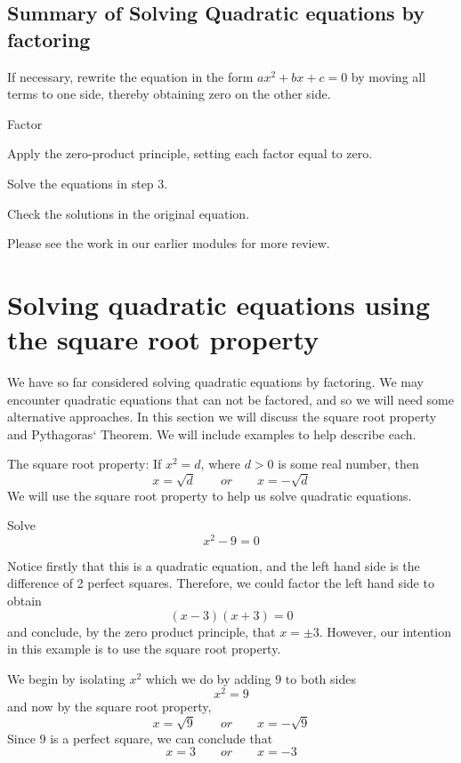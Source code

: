 \subsection{Summary of Solving Quadratic equations by factoring}
\begin{steps}
	\item If necessary, rewrite the equation in the form $ax^2+bx+c=0$ by moving all terms to one side, thereby obtaining
	zero on the other side.
	\item  Factor
	\item Apply the zero-product principle, setting each factor equal to zero.
	\item Solve the equations in step 3.
	\item Check the solutions in the original equation. 
\end{steps} 
Please see the work in our earlier modules for more review.

\section{Solving quadratic equations using the square root property}
%
We have so far considered solving quadratic equations by factoring. We may encounter quadratic equations
that can not be factored, and so we will need some alternative approaches. In this section we will discuss the square root property
and Pythagoras` Theorem. We will include examples to help describe each.
\begin{myDefinition}
	The square root property: If $x^2=d$, where $d>0$ is some real number, then
	\[
		x=\sqrt{d} \qquad or \qquad x=-\sqrt{d}
	\]
	{}
	We will use the square root property to help us solve quadratic equations.
\end{myDefinition}

\begin{myexample}
Solve
\[
	x^2-9=0
\]
{}
\end{myexample}
\begin{myProof}
	Notice firstly that this is a quadratic equation, and the left hand side is the difference of 2 perfect squares.
	Therefore, we could factor the left hand side to obtain
	\[
		(x-3)(x+3) = 0
	\]
	and conclude, by the zero product principle, that $x=\pm 3$. However, our intention in this example is to use 
	the square root property. 
		
	We begin by isolating $x^2$ which we do by adding $9$ to both sides
	\[
		x^2=9
	\]
	and now by the square root property, 
	\[
		x = \sqrt{9} \qquad or \qquad x=-\sqrt{9}
	\]
	Since $9$ is a perfect square, we can conclude that
	\[
		x = 3 \qquad or \qquad x=-3
	\]
	{}
\end{myProof} 

